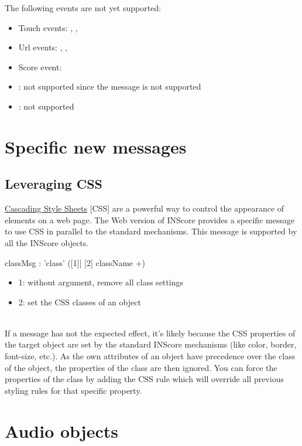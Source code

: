 \documentclass[a4paper,twoside]{article}
\newcommand{\toplevel}[1]	{\section{#1}}
\newcommand{\sublevel}[1]	{\subsection{#1}}
\begin{document}
The following events are not yet supported:
\begin{itemize}
\item Touch events: , , 
\item Url events: , , 
\item Score event: 
\item {}: not supported since the  message is not supported
\item {}: not supported
\end{itemize}

\toplevel{Specific new messages}
\label{newMessages}

\sublevel{Leveraging CSS}
\label{webCSS}

\href{https://www.w3schools.com/css/css_intro.asp}{Cascading Style Sheets} [CSS] are a powerful way to control the appearance of elements on a web page. The Web version of INScore provides a specific  message to use CSS in parallel to the standard mechanisms. This message is supported by all the INScore objects.

\begin{rail}
classMsg : 'class' ([1]| [2] className +)
\end{rail}

\begin{itemize}
\item 1: without argument, remove all class settings
\item 2: set the CSS classes of an object
\end{itemize}

\note{}\\
If a  message has not the expected effect, it's likely because the CSS properties of the target object are set by the standard INScore mechanisms (like color, border, font-size, etc.). As the own attributes of an object have precedence over the class of the object, the properties of the class are then ignored. You can force the properties of the class by adding the CSS rule  which will override all previous styling rules for that specific property.



\toplevel{Audio objects}
\label{audioObjects}
\end{document}
